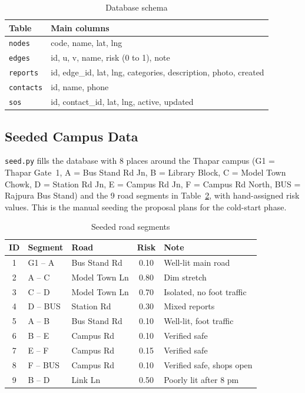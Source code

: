 \documentclass{tietreport}
\begin{document}
\begin{table}[h]
\centering
\small
\begin{tabular}{|l|p{9cm}|}
  \hline
  \textbf{Table} & \textbf{Main columns} \\ \hline
  \texttt{nodes}    & code, name, lat, lng \\ \hline
  \texttt{edges}    & id, u, v, name, risk (0 to 1), note \\ \hline
  \texttt{reports}  & id, edge\_id, lat, lng, categories, description, photo, created \\ \hline
  \texttt{contacts} & id, name, phone \\ \hline
  \texttt{sos}      & id, contact\_id, lat, lng, active, updated \\ \hline
\end{tabular}
\caption{Database schema}
\label{tab:schema}
\end{table}

\subsection{Seeded Campus Data}

\texttt{seed.py} fills the database with 8 places around the Thapar
campus (G1 = Thapar Gate~1, A = Bus Stand Rd Jn, B = Library Block,
C = Model Town Chowk, D = Station Rd Jn, E = Campus Rd Jn,
F = Campus Rd North, BUS = Rajpura Bus Stand) and the 9 road segments
in Table~\ref{tab:edges}, with hand-assigned risk values. This is the
manual seeding the proposal plans for the cold-start phase.

\begin{table}[h]
\centering
\small
\begin{tabular}{|c|l|l|c|p{4.6cm}|}
  \hline
  \textbf{ID} & \textbf{Segment} & \textbf{Road} & \textbf{Risk} &
  \textbf{Note} \\ \hline
  1 & G1 -- A   & Bus Stand Rd  & 0.10 & Well-lit main road \\ \hline
  2 & A -- C    & Model Town Ln & 0.80 & Dim stretch \\ \hline
  3 & C -- D    & Model Town Ln & 0.70 & Isolated, no foot traffic \\ \hline
  4 & D -- BUS  & Station Rd    & 0.30 & Mixed reports \\ \hline
  5 & A -- B    & Bus Stand Rd  & 0.10 & Well-lit, foot traffic \\ \hline
  6 & B -- E    & Campus Rd     & 0.10 & Verified safe \\ \hline
  7 & E -- F    & Campus Rd     & 0.15 & Verified safe \\ \hline
  8 & F -- BUS  & Campus Rd     & 0.10 & Verified safe, shops open \\ \hline
  9 & B -- D    & Link Ln       & 0.50 & Poorly lit after 8 pm \\ \hline
\end{tabular}
\caption{Seeded road segments}
\label{tab:edges}
\end{table}
\end{document}
